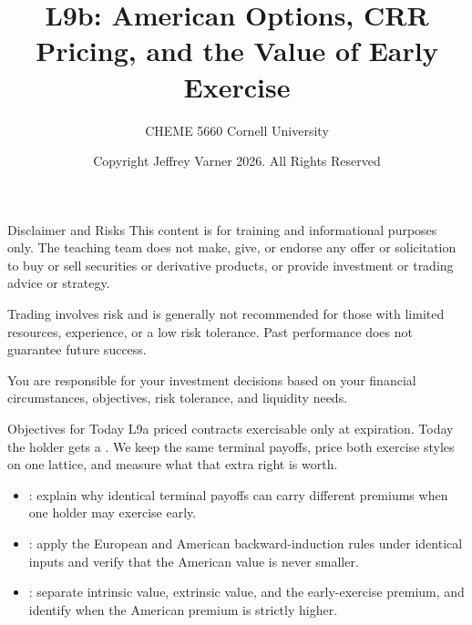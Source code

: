\documentclass[aspectratio=169,11pt]{beamer}
\title{\texorpdfstring{{\vnheavy L9b}}{L9b}: American Options, CRR Pricing, and the Value of Early Exercise}
\subtitle{CHEME 5660 Cornell University}
\author{Copyright Jeffrey Varner 2026. All Rights Reserved}
\begin{document}
\vntitlepage

\begin{frame}{Disclaimer and Risks}
  \vspace{0.6em}
  \textbf{} This content is for training and informational
  purposes only. The teaching team does not make, give, or endorse any offer or
  solicitation to buy or sell securities or derivative products, or provide
  investment or trading advice or strategy.

  \vspace{1.1em}
  \textbf{} Trading involves risk and is generally not recommended for
  those with limited resources, experience, or a low risk tolerance. Past
  performance does not guarantee future success.

  \vspace{1.1em}
  \textbf{} You are responsible for your investment decisions
  based on your financial circumstances, objectives, risk tolerance, and
  liquidity needs.
\end{frame}

\begin{frame}{Objectives for Today}
  L9a priced contracts exercisable only at expiration. Today the holder gets a
  . We keep the same terminal payoffs, price
  both exercise styles on one lattice, and measure what that extra right is
  worth.

  \vspace{0.5em}
  {\large\textbf{}}
  \begin{itemize}\setlength{\itemsep}{0.4em}
    \item {}: explain why identical
      terminal payoffs can carry different premiums when one holder may exercise
      early.
    \item {}: apply the European and
      American backward-induction rules under identical inputs and verify that
      the American value is never smaller.
    \item {}: separate intrinsic value,
      extrinsic value, and the early-exercise premium, and identify when the
      American premium is strictly higher.
  \end{itemize}
\end{frame}
\end{document}
